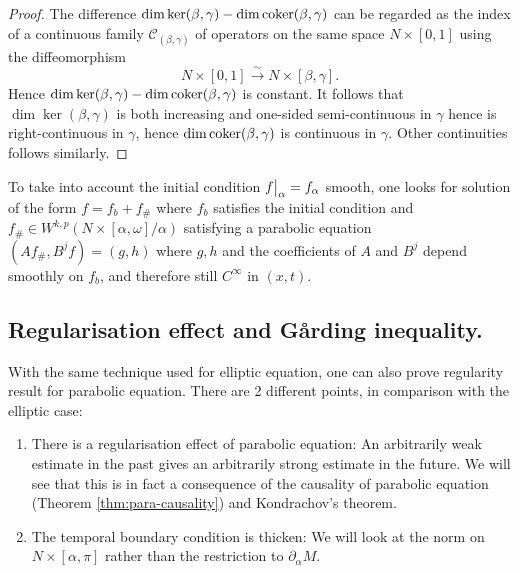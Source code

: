 \begin{proof}
The difference \(\dim \ker (\beta,\gamma) -\dim\mathop{\rm coker}\nolimits (\beta,\gamma)\) can be
regarded as the index of a continuous family \(\mathcal{C}_{(\beta,\gamma)}\) of
operators on the same space \(N\times [0,1]\) using the diffeomorphism
\[
 N\times [0,1] \xrightarrow{\sim} N\times [\beta,\gamma].
\]
Hence \(\dim\ker (\beta,\gamma) - \dim \mathop{\rm coker}\nolimits (\beta,\gamma)\) is constant. It follows
that \(\dim \ker (\beta,\gamma)\) is both increasing and one-sided semi-continuous in \(\gamma\) hence is right-continuous in \(\gamma\), hence \(\dim \mathop{\rm coker}\nolimits (\beta,\gamma)\) is continuous in \(\gamma\). Other continuities follows similarly.  
\end{proof}

\begin{remark}
\label{rem:init-cond-para}
To take into account the initial condition \(\restr{f}{\alpha} = f_\alpha\) smooth, one looks
for solution of the form \(f = f_b + f_\#\) where \(f_b\) satisfies the initial
condition and \(f_\#\in W^{k,p}(N\times[\alpha,\omega]/\alpha)\) satisfying a parabolic
equation \((A f_\#, B^j f) = (g,h)\) where \(g,h\) and the coefficients of \(A\) and
\(B^j\) depend smoothly on \(f_b\), and therefore still \(C^\infty\) in \((x,t)\).
\end{remark}



\subsection{Regularisation effect and Gårding inequality.}
\label{sec:org13c850a}

With the same technique used for elliptic equation, one can also prove regularity result
for parabolic equation. There are 2 different points, in comparison with the elliptic
case:
\begin{enumerate}
\item There is a regularisation effect of parabolic equation: An arbitrarily weak estimate in
the past gives an arbitrarily strong estimate in the future. We will see that this is
in fact a consequence of the causality of parabolic equation (Theorem \ref{thm:para-causality}) and Kondrachov's theorem.
\item The temporal boundary condition is thicken: We will look at the norm on \(N\times [\alpha,\pi]\) rather
than the restriction to \(\partial_\alpha M\).
\end{enumerate}

